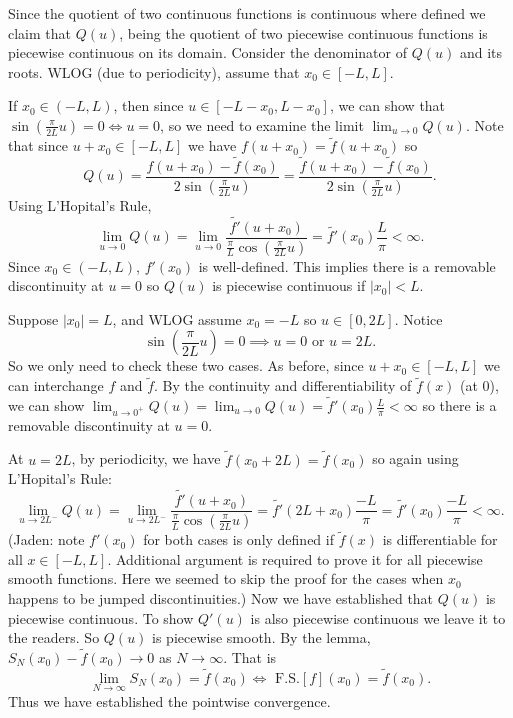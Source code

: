 \documentclass[class=article,crop=false]{standalone}
\begin{document}
\begin{prf}
Since the quotient of two continuous functions is continuous where defined we claim that  $Q(u)$, being the quotient of two piecewise continuous functions is piecewise continuous on its domain. Consider the denominator of  $Q(u)$ and its roots. WLOG (due to periodicity), assume that  $x_0 \in [-L,L]$. 
\begin{case}[1]
	If $x_0 \in (-L,L)$, then since $u \in [-L-x_0,L-x_0]$, we can show that $\sin\left( \frac{\pi}{2L} u \right) = 0 \iff u=0$, so we need to examine the limit $\lim_{ u \to 0} Q(u) $.
	Note that since $u+x_0 \in [-L,L]$ we have $f(u+x_0) = \tilde{ f } (u+x_0)$ so
	\[
		Q(u) = \frac{f(u+x_0)-\tilde{ f}(x_0)}{2\sin\left( \frac{\pi}{2L} u \right) } = \frac{\tilde{ f } (u+x_0) -\tilde{ f } (x_0)}{2\sin\left( \frac{\pi}{2L} u \right) }
	.\] 
	Using L'Hopital's Rule,
	\[
		\lim_{ u \to 0} Q(u) = \lim_{ u \to 0} \frac{\tilde{ f' }(u+x_0)}{\frac{\pi}{L}\cos \left( \frac{ \pi}{ 2L} u \right) } = \tilde{ f' } (x_0) \frac{L}{\pi} < \infty
	.\]
	Since $ x_0 \in (-L,L)$, $ f'(x_0)$ is well-defined. This implies there is a removable discontinuity at $ u=0$ so  $ Q(u)$ is piecewise continuous if  $ |x_0|<L$.
\end{case}
\begin{case}[2]
	Suppose $|x_0| =L$, and WLOG assume $x_0=-L$ so $u  \in [0,2L]$. Notice
	\[
		\sin\left( \frac{\pi}{2L}u \right) =0 \implies u=0 \text{ or } u=2L
	.\] 
	So we only need to check these two cases. As before, since $ u+x_0 \in[-L,L]$ we can interchange $ f$ and $ \tilde{ f }$.
	By the continuity and differentiability of $\tilde{ f } (x)$ (at 0), we can show $\lim_{ u \to 0^+} Q(u) = \lim_{ u \to 0} Q(u) = \tilde{ f }' (x_0)\frac{L}{\pi} < \infty$ so there is a removable discontinuity at $u=0$. 

	At  $u=2L$, by periodicity, we have  $\tilde{ f } (x_0+2L) = \tilde{f} (x_0)$ so again using L'Hopital's Rule:
	\[
		\lim_{ u \to 2L^-} Q(u) = \lim_{ u \to 2L^-} \frac{\tilde{f'}(u+x_0) }{\frac{\pi}{L}\cos \left( \frac{ \pi}{ 2L} u \right) } = \tilde{ f' }(2L+x_0) \frac{-L}{\pi} = \tilde{f'}(x_0) \frac{-L}{\pi}   < \infty  
	.\]
	(Jaden: note $ f'(x_0)$ for both cases is only defined if $ \tilde{  f}( x) $ is differentiable for all $x \in [-L,L]$. Additional argument is required to prove it for all piecewise smooth functions. Here we seemed to skip the proof for the cases when $x_0$ happens to be jumped discontinuities.)
	Now we have established that $Q(u)$ is piecewise continuous. To show  $Q'(u)$ is also piecewise continuous we leave it to the readers. So  $Q(u)$ is piecewise smooth.
	By the lemma,  $S_N(x_0)-\tilde{ f } (x_0) \to 0$ as $N \to \infty$. That is
	\[
		\lim_{ N \to \infty} S_N(x_0)=\tilde{ f } (x_0) \iff \text{ F.S.} [ f](x_0) = \tilde{ f } (x_0)
	.\] 
	Thus we have established the pointwise convergence.
\end{case}
\end{prf}
\end{document}
